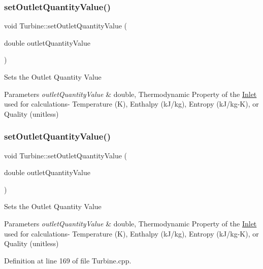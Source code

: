 \subsubsection{\texorpdfstring{set\+Outlet\+Quantity\+Value()}{setOutletQuantityValue()}\hspace{0.1cm}{\footnotesize\ttfamily [2/3]}}
{\footnotesize\ttfamily void Turbine\+::set\+Outlet\+Quantity\+Value (\begin{DoxyParamCaption}\item[{double}]{outlet\+Quantity\+Value }\end{DoxyParamCaption})}

Sets the Outlet Quantity Value


\begin{DoxyParams}{Parameters}
{\em outlet\+Quantity\+Value} & double, Thermodynamic Property of the \hyperlink{class_inlet}{Inlet} used for calculations-\/ Temperature (K), Enthalpy (k\+J/kg), Entropy (k\+J/kg-\/K), or Quality (unitless) \\
\hline
\end{DoxyParams}
\mbox{\label{class_turbine_ab37326068f633280de8f8144b9c8eb89}} 
\subsubsection{\texorpdfstring{set\+Outlet\+Quantity\+Value()}{setOutletQuantityValue()}\hspace{0.1cm}{\footnotesize\ttfamily [3/3]}}
{\footnotesize\ttfamily void Turbine\+::set\+Outlet\+Quantity\+Value (\begin{DoxyParamCaption}\item[{double}]{outlet\+Quantity\+Value }\end{DoxyParamCaption})}

Sets the Outlet Quantity Value


\begin{DoxyParams}{Parameters}
{\em outlet\+Quantity\+Value} & double, Thermodynamic Property of the \hyperlink{class_inlet}{Inlet} used for calculations-\/ Temperature (K), Enthalpy (k\+J/kg), Entropy (k\+J/kg-\/K), or Quality (unitless) \\
\hline
\end{DoxyParams}


Definition at line 169 of file Turbine.\+cpp.

